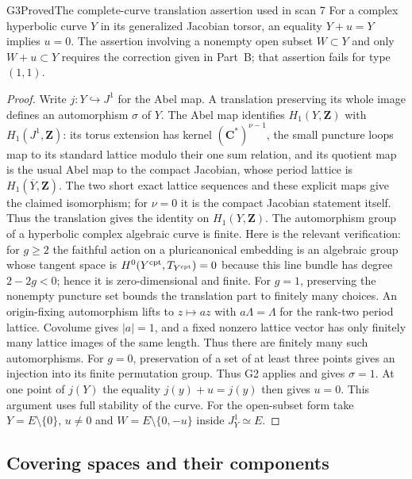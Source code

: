 \begin{result}{G3}{Proved}{The complete-curve translation assertion used in scan 7}
For a complex hyperbolic curve $Y$ in its generalized Jacobian torsor,
an equality $Y+u=Y$ implies $u=0$. The assertion involving a nonempty
open subset $W\subset Y$ and only $W+u\subset Y$ requires the correction
given in Part~B; that assertion fails for type $(1,1)$.
\end{result}
\begin{proof}
Write $j:Y\hookrightarrow J^1$ for the Abel map. A translation
preserving its whole image defines an automorphism $\sigma$ of $Y$.
The Abel map identifies
$H_1(Y,\mathbf Z)$ with $H_1(J^1,\mathbf Z)$: its torus extension has
kernel $(\mathbf C^*)^{\nu-1}$, the small puncture loops map to its
standard lattice modulo their one sum relation, and its quotient map
is the usual Abel map to the compact Jacobian, whose period lattice
is $H_1(\overline Y,\mathbf Z)$. The two short exact lattice sequences
and these explicit maps give the claimed isomorphism; for $\nu=0$ it
is the compact Jacobian statement itself. Thus the translation gives
the identity on $H_1(Y,\mathbf Z)$. The automorphism group of a
hyperbolic complex algebraic curve is finite. Here is the relevant
verification: for $g\geq2$ the faithful action on a pluricanonical
embedding is an algebraic group whose tangent space is
$H^0(Y^{\rm cpt},T_{Y^{\rm cpt}})=0$ because this line bundle has degree
$2-2g<0$; hence it is zero-dimensional and finite. For $g=1$, preserving
the nonempty puncture set bounds the translation part to finitely many
choices. An origin-fixing automorphism lifts to $z\mapsto az$ with
$a\Lambda=\Lambda$ for the rank-two period lattice. Covolume gives
$|a|=1$, and a fixed nonzero lattice vector has only finitely many
lattice images of the same length. Thus there are finitely many such
automorphisms. For $g=0$, preservation of a
set of at least three points gives an injection into its finite
permutation group. Thus G2 applies and gives $\sigma=1$. At one point
of $j(Y)$ the equality $j(y)+u=j(y)$ then gives $u=0$.
This argument uses full stability of the curve. For the open-subset
form take $Y=E\setminus\{0\}$, $u\ne0$ and
$W=E\setminus\{0,-u\}$ inside $J_Y^1\simeq E$.
\end{proof}

\subsection{Covering spaces and their components}

